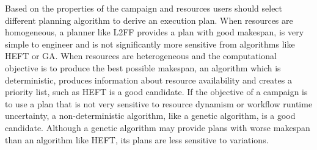Based on the properties of the campaign and resources users should select
different planning algorithm to derive an execution plan. When resources are
homogeneous, a planner like L2FF provides a plan with good makespan, is very
simple to engineer and is not significantly more sensitive from algorithms
like HEFT or GA. When resources are heterogeneous and the computational
objective is to produce the best possible makespan, an algorithm which is
deterministic, produces information about resource availability and creates a
priority list, such as HEFT is a good candidate. If the objective of a
campaign is to use a plan that is not very sensitive to resource dynamism or
workflow runtime uncertainty, a non-deterministic algorithm, like a genetic
algorithm, is a good candidate. Although a genetic algorithm may provide plans
with worse makespan than an algorithm like HEFT, its plans are less sensitive
to variations.



%
%

